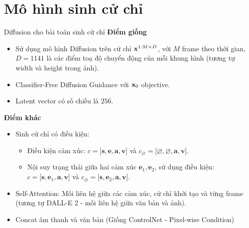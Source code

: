 
\section{Mô hình sinh cử chỉ}

%


\begin{frame}{Diffusion cho bài toán sinh cử chỉ}
	\textbf{Điểm giống}
	\begin{itemize}
		\item Sử dụng mô hình Diffusion \cite{yang2023diffusestylegesture} trên cử chỉ $\mathbf{x}^{1:M \times D}$,  với $M$ frame theo thời gian, $D=1141$ là các điểm toạ độ chuyển động của mỗi khung hình (tương tự width và height trong ảnh).
		\item Classifier-Free Diffusion Guidance với $\mathbf{x}_0$ objective.
		\item Latent vector có số chiều là $256$.
		\end{itemize}
		
		\textbf{Điểm khác}
		
		\begin{itemize}
			\item Sinh cử chỉ có điều kiện:
			\begin{itemize}
				\item Điều kiện cảm xúc: $c = \big[ \mathbf{s}, \mathbf{e}, \mathbf{a}, \mathbf{v} \big]$ và $c_{\varnothing} = \big[ \varnothing, \varnothing, \mathbf{a}, \mathbf{v}\big]$.
				\item Nội suy trạng thái giữa hai cảm xúc $\mathbf{e}_1, \mathbf{e}_2$, sử dụng điều kiện: $c = \big[ \mathbf{s}, \mathbf{e}_1, \mathbf{a}, \mathbf{v} \big]$ và $c_{\varnothing} = \big[ \mathbf{s}, \mathbf{e}_2, \mathbf{a}, \mathbf{v} \big]$.
			\end{itemize}
			\item Self-Attention: Mối liên hệ giữa các cảm xúc, cử chỉ khởi tạo và từng frame (tương tự DALL-E 2 - mối liên hệ giữa văn bản và ảnh).
			\item Concat âm thanh và văn bản (Giống ControlNet - Pixel-wise Condition)
		\end{itemize}
\end{frame}

